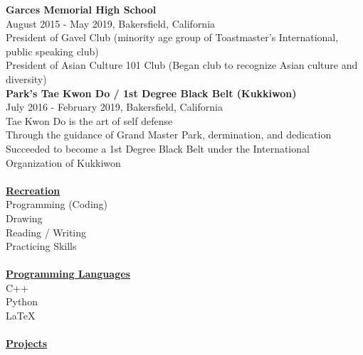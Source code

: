 \documentclass[10pt, letterpaper]{article}                %
\begin{document}
\textbf{Garces Memorial High School}\\
August 2015 - May 2019, Bakersfield, California\\
President of Gavel Club (minority age group of Toastmaster's International, public speaking club)\\
President of Asian Culture 101 Club (Began club to recognize Asian culture and diversity)\\
\textbf{Park's Tae Kwon Do / 1st Degree Black Belt (Kukkiwon)}\\
July 2016 - February 2019, Bakersfield, California\\
Tae Kwon Do is the art of self defense\\
Through the guidance of Grand Master Park, dermination, and dedication\\
Succeeded to become a 1st Degree Black Belt under the International Organization of Kukkiwon\\
\\
\textbf{\underline{Recreation}}\\
Programming (Coding)\\
Drawing\\
Reading / Writing\\
Practicing Skills\\
\\
\textbf{\underline{Programming Languages}}\\
C++\\
Python\\
LaTeX\\
\\
\textbf{\underline{Projects}}
\end{document}
